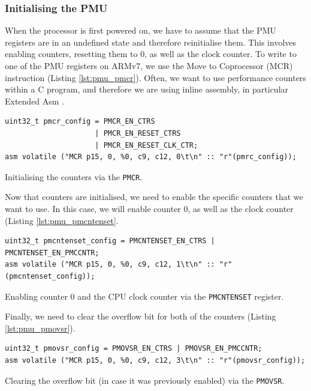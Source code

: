 {\subsubsection{Initialising the PMU}

When the processor is first powered on, we have to assume that the PMU registers are in an undefined state and therefore reinitialise them. This involves enabling counters, resetting them to 0, as well as the clock counter. To write to one of the PMU registers on ARMv7, we use the Move to Coprocessor (MCR) instruction \cite{DocsArmMCR} (Listing \ref{lst:pmu_pmcr}). Often, we want to use performance counters within a C program, and therefore we are using inline assembly, in particular Extended Asm \cite{DocsGCCExtendedAsm}.

\begin{listing}
    \begin{verbatim}
uint32_t pmcr_config = PMCR_EN_CTRS
                     | PMCR_EN_RESET_CTRS
                     | PMCR_EN_RESET_CLK_CTR;
asm volatile ("MCR p15, 0, %0, c9, c12, 0\t\n" :: "r"(pmrc_config));
    \end{verbatim}
    \caption{Initialising the counters via the \texttt{PMCR}.}
    \label{lst:pmu_pmcr}
\end{listing}

Now that counters are initialised, we need to enable the specific counters that we want to use. In this case, we will enable counter 0, as well as the clock counter (Listing \ref{lst:pmu_pmcntenset}.

\begin{listing}
    \begin{verbatim}
uint32_t pmcntenset_config = PMCNTENSET_EN_CTRS | PMCNTENSET_EN_PMCCNTR;
asm volatile ("MCR p15, 0, %0, c9, c12, 1\t\n" :: "r"(pmcntenset_config));
    \end{verbatim}
    \caption{Enabling counter 0 and the CPU clock counter via the \texttt{PMCNTENSET} register.}
    \label{lst:pmu_pmcntenset}
\end{listing}

Finally, we need to clear the overflow bit for both of the counters (Listing \ref{lst:pmu_pmovsr}).

\begin{listing}
    \begin{verbatim}
uint32_t pmovsr_config = PMOVSR_EN_CTRS | PMOVSR_EN_PMCCNTR;
asm volatile ("MCR p15, 0, %0, c9, c12, 3\t\n" :: "r"(pmovsr_config));
    \end{verbatim}
    \caption{Clearing the overflow bit (in case it was previously enabled) via the \texttt{PMOVSR}.}
    \label{lst:pmu_pmovsr}
\end{listing}

}
